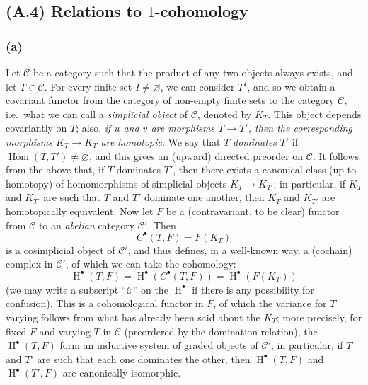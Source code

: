 \documentclass{article}
\theoremstyle{definition}
\theoremstyle{definition}
\theoremstyle{definition}
\theoremstyle{definition}
\theoremstyle{remark}
\begin{document}
\hypertarget{fga-3-i-section-A.4}{%
\subsection{\texorpdfstring{(A.4) Relations to \(1\)-cohomology}{(A.4) Relations to 1-cohomology}}\label{fga-3-i-section-A.4}}

\hypertarget{fga-3-i-section-A.4.a}{%
\subsubsection{(a)}\label{fga-3-i-section-A.4.a}}

Let \({\mathcal{C}}\) be a category such that the product of any two objects always exists, and let \(T\in{\mathcal{C}}\).
For every finite set \(I\neq\varnothing\), we can consider \(T^I\), and so we obtain a covariant functor from the category of non-empty finite sets to the category \({\mathcal{C}}\), i.e.~what we can call a \emph{simplicial object} of \({\mathcal{C}}\), denoted by \(K_T\).
This object depends covariantly on \(T\);
also, \emph{if \(u\) and \(v\) are morphisms \(T\to T'\), then the corresponding morphisms \(K_T\to K_{T}\) are homotopic}.
We say that \(T\) \emph{dominates} \(T'\) if \(\operatorname{Hom}(T,T')\neq\varnothing\), and this gives an (upward) directed preorder on \({\mathcal{C}}\).
It follows from the above that, if \(T\) dominates \(T'\), then there exists a canonical class (up to homotopy) of homomorphisms of simplicial objects \(K_T\to K_{T'}\);
in particular, if \(K_T\) and \(K_{T'}\) are such that \(T\) and \(T'\) dominate one another, then \(K_T\) and \(K_{T'}\) are homotopically equivalent.
Now let \(F\) be a (contravariant, to be clear) functor from \({\mathcal{C}}\) to an \emph{abelian} category \({\mathcal{C}}'\).
Then
\[
  C^\bullet(T,F) = F(K_T)
\]
is a cosimplicial object of \({\mathcal{C}}'\), and thus defines, in a well-known way, a (cochain) complex in \({\mathcal{C}}'\), of which we can take the cohomology:
\[
  \operatorname{H}^\bullet(T,F)
  = \operatorname{H}^\bullet(C^\bullet(T,F))
  = \operatorname{H}^\bullet(F(K_T))
\]
(we may write a subscript ``\({\mathcal{C}}\)'' on the \(\operatorname{H}^\bullet\) if there is any possibility for confusion).
This is a cohomological functor in \(F\), of which the variance for \(T\) varying follows from what has already been said about the \(K_T\);
more precisely, for fixed \(F\) and varying \(T\) in \({\mathcal{C}}\) (preordered by the domination relation), the \(\operatorname{H}^\bullet(T,F)\) form an inductive system of graded objects of \({\mathcal{C}}'\);
in particular, if \(T\) and \(T'\) are such that each one dominates the other, then \(\operatorname{H}^\bullet(T,F)\) and \(\operatorname{H}^\bullet(T',F)\) are canonically isomorphic.
\end{document}
